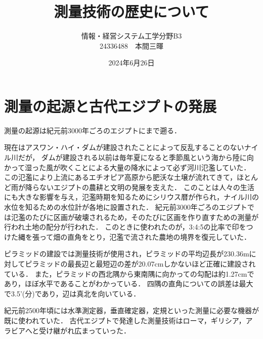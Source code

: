 \documentclass[titlepage]{jarticle}
\begin{document}
\title{測量技術の歴史について}
\author{情報・経営システム工学分野B3\\24336488　本間三暉}
\date{2024年6月26日}
\maketitle
\section{測量の起源と古代エジプトの発展}
測量の起源は紀元前3000年ごろのエジプトにまで遡る．

現在はアスワン・ハイ・ダムが建設されたことによって反乱することのないナイル川だが，
ダムが建設される以前は毎年夏になると季節風という海から陸に向かって湿った風が吹くことによる大量の降水によって必ず河川氾濫していた．
この氾濫により上流にあるエチオピア高原から肥沃な土壌が流れてきて，ほとんど雨が降らないエジプトの農耕と文明の発展を支えた．
このことは人々の生活にも大きな影響を与え，氾濫時期を知るためにシリウス暦が作られ，ナイル川の水位を知るための水位計が各地に設置された．
紀元前3000年ごろのエジプトでは氾濫のたびに区画が破壊されるため，そのたびに区画を作り直すための測量が行われ土地の配分が行われた．
このときに使われたのが，3:4:5の比率で印をつけた縄を張って畑の直角をとり，氾濫で流された農地の境界を復元していた．

ピラミッドの建設では測量技術が使用され，ピラミッドの平均辺長が230.36mに対してピラミッドの最長辺と最短辺の差が20.07cmしかないほど正確に建設されている．
また，ピラミッドの西北隅から東南隅に向かっての勾配は約1.27cmであり，ほぼ水平であることがわかっている．
四隅の直角についての誤差は最大で3.5’(分)であり，辺は真北を向いている．

紀元前2500年頃には水準測定器，垂直確定器，定規といった測量に必要な機器が既に使われていた．
古代エジプトで発達した測量技術はローマ，ギリシア，アラビアへと受け継がれ広まっていった．
\end{document}
